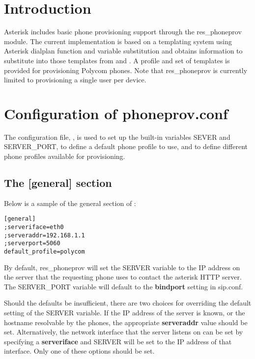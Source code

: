 \section{Introduction}

Asterisk includes basic phone provisioning support through the res\_phoneprov module. The 
current implementation is based on a templating system using Asterisk dialplan function 
and variable substitution and obtains information to substitute into those templates from 
 and .  A profile and set of templates is provided 
for provisioning Polycom phones. Note that res\_phoneprov is currently limited to 
provisioning a single user per device.

\section{Configuration of phoneprov.conf}

The configuration file, , is used to set up the built-in variables 
SEVER and SERVER\_PORT, to define a default phone profile to use, and to define different 
phone profiles available for provisioning.

\subsection{The [general] section}

Below is a sample of the general section of :

\begin{astlisting}
\begin{verbatim}
[general]
;serveriface=eth0
;serveraddr=192.168.1.1
;serverport=5060
default_profile=polycom
\end{verbatim}
\end{astlisting}

By default, res\_phoneprov will set the SERVER variable to the IP address on the server
that the requesting phone uses to contact the asterisk HTTP server.  The SERVER\_PORT
variable will default to the \textbf{bindport} setting in sip.conf.

Should the defaults be insufficient, there are two choices for overriding the default 
setting of the SERVER variable. If the IP address of the server is known, or the hostname 
resolvable by the phones, the appropriate \textbf{serveraddr} value should be set.  
Alternatively, the network interface that the server listens on can be set by specifying a
\textbf{serveriface} and SERVER will be set to the IP address of that interface.  Only one
of these options should be set.

